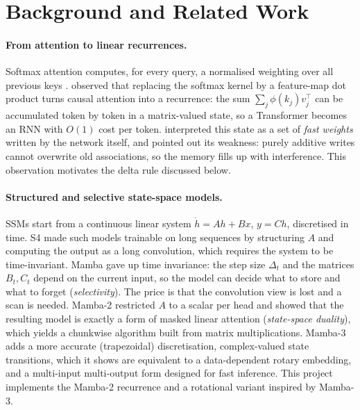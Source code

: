 \section{Background and Related Work}
\label{sec:background}

\paragraph{From attention to linear recurrences.} Softmax attention computes, for every query, a
normalised weighting over all previous keys \citep{vaswani2017attention}. \citet{katharopoulos2020transformers}
observed that replacing the softmax kernel by a feature-map dot product turns causal attention into a
recurrence: the sum $\sum_j \phi(k_j) v_j^\top$ can be accumulated token by token in a matrix-valued state,
so a Transformer becomes an RNN with $O(1)$ cost per token. \citet{schlag2021linear} interpreted this state
as a set of \emph{fast weights} written by the network itself, and pointed out its weakness: purely
additive writes cannot overwrite old associations, so the memory fills up with interference. This
observation motivates the delta rule discussed below.

\paragraph{Structured and selective state-space models.} SSMs start from a continuous linear system
$\dot h = Ah + Bx$, $y = Ch$, discretised in time. S4 \citep{gu2022s4} made such models trainable on long
sequences by structuring $A$ and computing the output as a long convolution, which requires the system to
be time-invariant. Mamba \citep{gu2023mamba} gave up time invariance: the step size $\Delta_t$ and the
matrices $B_t, C_t$ depend on the current input, so the model can decide what to store and what to forget
(\emph{selectivity}). The price is that the convolution view is lost and a scan is needed. Mamba-2
\citep{dao2024ssd} restricted $A$ to a scalar per head and showed that the resulting model is exactly a
form of masked linear attention (\emph{state-space duality}), which yields a chunkwise algorithm built from
matrix multiplications. Mamba-3 \citep{mamba3} adds a more accurate (trapezoidal) discretisation,
complex-valued state transitions, which it shows are equivalent to a data-dependent rotary embedding, and a
multi-input multi-output form designed for fast inference. This project implements the Mamba-2 recurrence
and a rotational variant inspired by Mamba-3.

